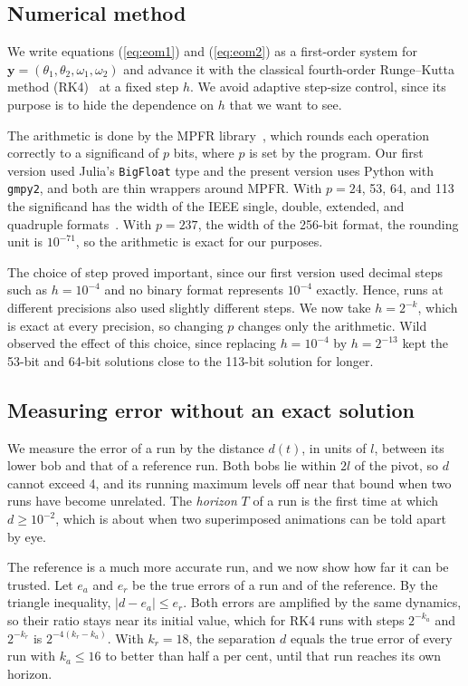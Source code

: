 \documentclass[12pt,a4paper]{article}
\begin{document}
\subsection{Numerical method}

We write equations (\ref{eq:eom1}) and (\ref{eq:eom2}) as a first-order system
for $\bm y=(\theta_1,\theta_2,\omega_1,\omega_2)$ and advance it with the
classical fourth-order Runge--Kutta method (RK4)~\cite{hairer1993} at a fixed
step $h$. We avoid adaptive step-size control, since its purpose is to hide the
dependence on $h$ that we want to see.

The arithmetic is done by the MPFR library~\cite{fousse2007}, which rounds each
operation correctly to a significand of $p$ bits, where $p$ is set by the
program. Our first version used Julia's \texttt{BigFloat} type and the present
version uses Python with \texttt{gmpy2}, and both are thin wrappers around MPFR.
With $p=24$, 53, 64, and 113 the significand has the width of the IEEE single,
double, extended, and quadruple formats~\cite{ieee754,goldberg1991}. With $p=237$, the
width of the 256-bit format, the rounding unit is $10^{-71}$, so the arithmetic
is exact for our purposes.

The choice of step proved important, since our first version used decimal steps
such as $h=10^{-4}$ and no binary format represents $10^{-4}$ exactly. Hence,
runs at different precisions also used slightly different steps. We now take
$h=2^{-k}$, which is exact at every precision, so changing $p$ changes only the
arithmetic. Wild~\cite{wild2019} observed the effect of this choice, since
replacing $h=10^{-4}$ by $h=2^{-13}$ kept the 53-bit and 64-bit solutions close
to the 113-bit solution for longer.

\subsection{Measuring error without an exact solution}

We measure the error of a run by the distance $d(t)$, in units of $l$, between
its lower bob and that of a reference run. Both bobs lie within $2l$ of the
pivot, so $d$ cannot exceed 4, and its running maximum levels off near that
bound when two runs have become unrelated. The
\emph{horizon} $T$ of a run is the first time at which $d\ge10^{-2}$, which is
about when two superimposed animations can be told apart by eye.

The reference is a much more accurate run, and we now show how far it can be
trusted. Let $e_a$ and $e_r$ be the true errors of a run and of the reference.
By the triangle inequality, $|d-e_a|\le e_r$. Both errors are amplified by the
same dynamics, so their ratio stays near its initial value, which for RK4 runs
with steps $2^{-k_a}$ and $2^{-k_r}$ is $2^{-4(k_r-k_a)}$. With $k_r=18$, the
separation $d$ equals the true error of every run with $k_a\le16$ to better than
half a per cent, until that run reaches its own horizon.
\end{document}
